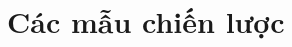 \documentclass{report} %
\begin{document}
% 


\chapter{Các mẫu chiến lược}

% 















% 


% 

\end{document}
